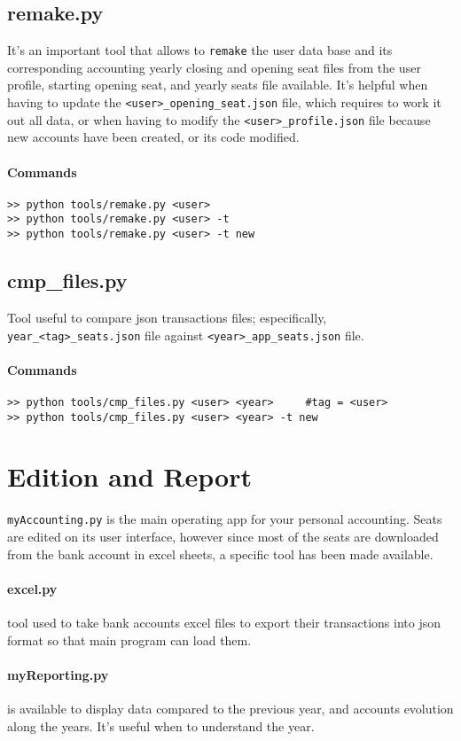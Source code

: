 \documentclass[12pt, a4paper]{article}
\begin{document}
\subsection{remake.py}
It's an important tool that allows to \verb!remake! the user data base and its corresponding accounting yearly closing and opening seat files from the user profile, starting opening seat, and yearly seats file available.
It's helpful when having to update the \verb!<user>_opening_seat.json! file, which requires to work it out all data, or when having to modify the \verb!<user>_profile.json! file because new accounts have been created, or its code modified.
\paragraph{Commands}
\begin{verbatim}
>> python tools/remake.py <user>   
>> python tools/remake.py <user> -t     
>> python tools/remake.py <user> -t new  
\end{verbatim}
\subsection{cmp\_files.py} 
Tool useful to compare json transactions files; especifically, \verb!year_<tag>_seats.json! file against \verb!<year>_app_seats.json! file.
\paragraph{Commands}
\begin{verbatim}
>> python tools/cmp_files.py <user> <year>     #tag = <user>
>> python tools/cmp_files.py <user> <year> -t new
\end{verbatim}
  \section{Edition and Report}
  \verb!myAccounting.py! is the main operating app for your personal accounting. 
  Seats are edited on its user interface, however since most of the seats are downloaded from the bank account in excel sheets, a specific tool has been made available.
 \paragraph{excel.py} tool used to take bank accounts excel files to export their transactions into json format so that main program can load them. 
 \paragraph{myReporting.py} is available to display data compared to the previous year, and accounts evolution along the years. It's useful when to understand the year.
 
\end{document}
